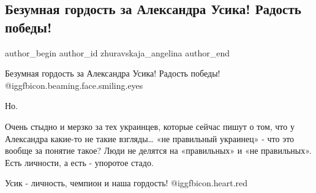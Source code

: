  
 
 
 
 
 
\subsection{Безумная гордость за Александра Усика! Радость победы!}
\label{sec:26_09_2021.fb.zhuravskaja_angelina.1.usik_radost_pobedy}
 
\ifcmt
 author_begin
   author_id zhuravskaja_angelina
 author_end
\fi

Безумная гордость за Александра Усика! Радость победы!  @igg{fbicon.beaming.face.smiling.eyes} 

Но.

Очень стыдно и мерзко за тех украинцев, которые сейчас пишут о том, что у
Александра какие-то не такие взгляды… «не правильный украинец» - что это вообще
за понятие такое? Люди не делятся на «правильных» и «не правильных». Есть
личности, а есть - упоротое стадо.

Усик - личность, чемпион и наша гордость! @igg{fbicon.heart.red}


